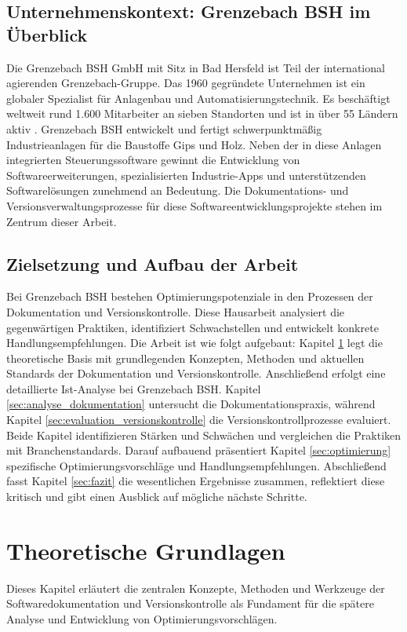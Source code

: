 \documentclass[12pt,oneside]{article}
\begin{document}
    \subsection{Unternehmenskontext: Grenzebach BSH im Überblick}
    \label{subsec:unternehmenskontext}
    Die Grenzebach BSH GmbH mit Sitz in Bad Hersfeld ist Teil der international agierenden Grenzebach-Gruppe.
    Das 1960 gegründete Unternehmen ist ein globaler Spezialist für Anlagenbau und Automatisierungstechnik. Es beschäftigt weltweit rund 1.600 Mitarbeiter an sieben Standorten und ist in über 55 Ländern aktiv \cite{GrenzebachWebsite}.
    Grenzebach BSH entwickelt und fertigt schwerpunktmäßig Industrieanlagen für die Baustoffe Gips und Holz.
    Neben der in diese Anlagen integrierten Steuerungssoftware gewinnt die Entwicklung von Softwareerweiterungen, spezialisierten Industrie-Apps und unterstützenden Softwarelösungen zunehmend an Bedeutung.
    Die Dokumentations- und Versionsverwaltungsprozesse für diese Softwareentwicklungsprojekte stehen im Zentrum dieser Arbeit.

    \subsection{Zielsetzung und Aufbau der Arbeit}
    \label{subsec:zielsetzung}
    Bei Grenzebach BSH bestehen Optimierungspotenziale in den Prozessen der Dokumentation und Versionskontrolle. Diese Hausarbeit analysiert die gegenwärtigen Praktiken, identifiziert Schwachstellen und entwickelt konkrete Handlungsempfehlungen.
    \newline
    Die Arbeit ist wie folgt aufgebaut:
    Kapitel \ref{sec:grundlagen} legt die theoretische Basis mit grundlegenden Konzepten, Methoden und aktuellen Standards der Dokumentation und Versionskontrolle.
    Anschließend erfolgt eine detaillierte Ist-Analyse bei Grenzebach BSH.
    Kapitel \ref{sec:analyse_dokumentation} untersucht die Dokumentationspraxis, während Kapitel \ref{sec:evaluation_versionskontrolle} die Versionskontrollprozesse evaluiert. Beide Kapitel identifizieren Stärken und Schwächen und vergleichen die Praktiken mit Branchenstandards.
    Darauf aufbauend präsentiert Kapitel \ref{sec:optimierung} spezifische Optimierungsvorschläge und Handlungsempfehlungen.
    Abschließend fasst Kapitel \ref{sec:fazit} die wesentlichen Ergebnisse zusammen, reflektiert diese kritisch und gibt einen Ausblick auf mögliche nächste Schritte.



    \section{Theoretische Grundlagen}
    \label{sec:grundlagen}
    Dieses Kapitel erläutert die zentralen Konzepte, Methoden und Werkzeuge der Softwaredokumentation und Versionskontrolle als Fundament für die spätere Analyse und Entwicklung von Optimierungsvorschlägen.
\end{document}

